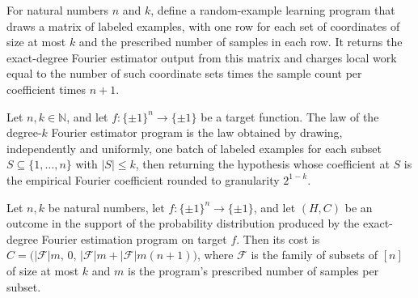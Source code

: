 \begin{definition}
\label{FABL.exactDegreeFourierEstimatorProgram}
\leanok
{}
For natural numbers $n$ and $k$, define a random-example learning program that draws a
matrix of labeled examples, with one row for each set of coordinates of size at most $k$
and the prescribed number of samples in each row. It returns the exact-degree Fourier
estimator output from this matrix and charges local work equal to the number of such
coordinate sets times the sample count per coefficient times $n+1$.
\end{definition}

\begin{theorem}
\label{FABL.runWithCost_exactDegreeFourierEstimatorProgram}
\leanok
{}
Let $n,k\in\mathbb N$, and let $f:\{\pm1\}^n\to\{\pm1\}$ be a target function. The law
of the degree-$k$ Fourier estimator program is the law obtained by drawing,
independently and uniformly, one batch of labeled examples for each subset
$S\subseteq\{1,\ldots,n\}$ with $|S|\le k$, then returning the hypothesis whose
coefficient at $S$ is the empirical Fourier coefficient rounded to granularity
$2^{1-k}$.
\end{theorem}

\begin{theorem}
\label{FABL.exactDegreeFourierEstimatorProgram_cost_eq}
\leanok
{}
Let $n,k$ be natural numbers, let $f:\{\pm1\}^n\to\{\pm1\}$, and let $(H,C)$ be an
outcome in the support of the probability distribution produced by the exact-degree
Fourier estimation program on target $f$. Then its cost is $C=\bigl(|\mathcal
F|m,\,0,\,|\mathcal F|m+|\mathcal F|m(n+1)\bigr)$, where $\mathcal F$ is the family of
subsets of $[n]$ of size at most $k$ and $m$ is the program's prescribed number of
samples per subset.
\end{theorem}

